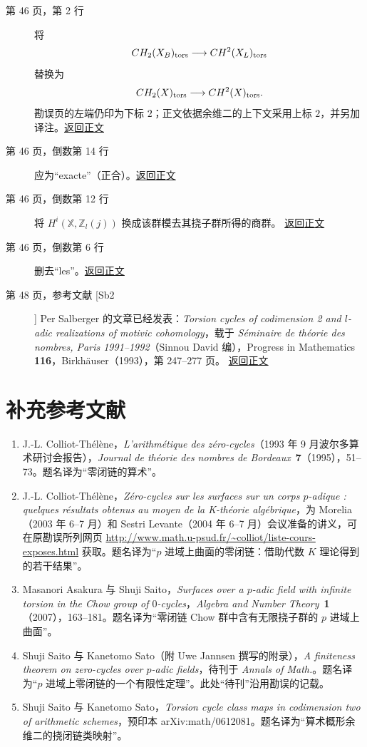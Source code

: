 \begin{description}
\item[第 46 页，第 2 行]
将
\[
 CH_2(X_B)_{\mathrm{tors}}\longrightarrow CH^2(X_L)_{\mathrm{tors}}
\]
替换为
\[
 CH_2(X)_{\mathrm{tors}}\longrightarrow CH^2(X)_{\mathrm{tors}}.
\]
勘误页的左端仍印为下标 $2$；正文依据余维二的上下文采用上标 $2$，并另加译注。\hfill\hyperref[orig:51]{返回正文}

\item[第 46 页，倒数第 14 行]
应为“exacte”（正合）。\hfill\hyperref[orig:51]{返回正文}

\item[第 46 页，倒数第 12 行]
将 $H^i(\mathbb X,\mathbb Z_l(j))$ 换成该群模去其挠子群所得的商群。
\hfill\hyperref[orig:51]{返回正文}

\item[第 46 页，倒数第 6 行]
删去“les”。\hfill\hyperref[orig:51]{返回正文}

\item[第 48 页，参考文献 [Sb2]]
Per Salberger 的文章已经发表：\emph{Torsion cycles of codimension 2 and $l$-adic realizations of motivic cohomology}，载于 \emph{Séminaire de théorie des nombres, Paris 1991--1992}（Sinnou David 编），Progress in Mathematics \textbf{116}，Birkhäuser（1993），第 247--277 页。
\hfill\hyperref[orig:53]{返回正文}
\end{description}

\section*{补充参考文献}
\begin{enumerate}
\item J.-L. Colliot-Thélène，\emph{L'arithmétique des zéro-cycles}（1993 年 9 月波尔多算术研讨会报告），\emph{Journal de théorie des nombres de Bordeaux}\ \textbf{7}（1995），51--73。题名译为“零闭链的算术”。
\item J.-L. Colliot-Thélène，\emph{Zéro-cycles sur les surfaces sur un corps $p$-adique : quelques résultats obtenus au moyen de la K-théorie algébrique}，为 Morelia（2003 年 6--7 月）和 Sestri Levante（2004 年 6--7 月）会议准备的讲义，可在原勘误所列网页 \url{http://www.math.u-psud.fr/~colliot/liste-cours-exposes.html} 获取。题名译为“$p$ 进域上曲面的零闭链：借助代数 $K$ 理论得到的若干结果”。
\item Masanori Asakura 与 Shuji Saito，\emph{Surfaces over a $p$-adic field with infinite torsion in the Chow group of $0$-cycles}，\emph{Algebra and Number Theory}\ \textbf{1}（2007），163--181。题名译为“零闭链 Chow 群中含有无限挠子群的 $p$ 进域上曲面”。
\item Shuji Saito 与 Kanetomo Sato（附 Uwe Jannsen 撰写的附录），\emph{A finiteness theorem on zero-cycles over $p$-adic fields}，待刊于 \emph{Annals of Math.}。题名译为“$p$ 进域上零闭链的一个有限性定理”。此处“待刊”沿用勘误的记载。
\item Shuji Saito 与 Kanetomo Sato，\emph{Torsion cycle class maps in codimension two of arithmetic schemes}，预印本 arXiv:math/0612081。题名译为“算术概形余维二的挠闭链类映射”。
\end{enumerate}
